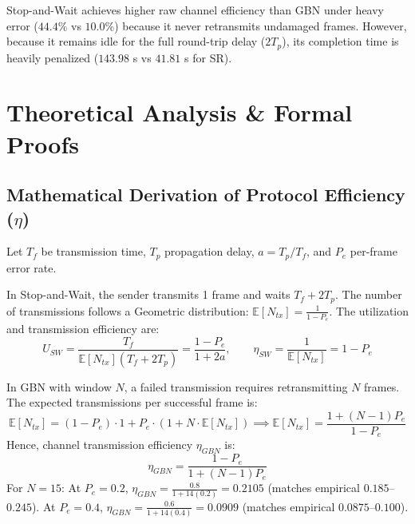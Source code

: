 \documentclass[11pt,a4paper]{article}
\begin{document}
\begin{analysisbox}
Stop-and-Wait achieves higher raw channel efficiency than GBN under heavy error ($44.4\%$ vs $10.0\%$) because it never retransmits undamaged frames. However, because it remains idle for the full round-trip delay ($2T_p$), its completion time is heavily penalized ($143.98$ s vs $41.81$ s for SR).
\end{analysisbox}

\section{Theoretical Analysis \& Formal Proofs}

\subsection{Mathematical Derivation of Protocol Efficiency (\texorpdfstring{$\eta$}{eta})}
Let $T_f$ be transmission time, $T_p$ propagation delay, $a = T_p / T_f$, and $P_e$ per-frame error rate.

\begin{proofbox}
In Stop-and-Wait, the sender transmits 1 frame and waits $T_f + 2T_p$. The number of transmissions follows a Geometric distribution: $\mathbb{E}[N_{tx}] = \frac{1}{1 - P_e}$. The utilization and transmission efficiency are:
\begin{equation}
    U_{SW} = \frac{T_f}{\mathbb{E}[N_{tx}](T_f + 2T_p)} = \frac{1 - P_e}{1 + 2a}, \qquad \eta_{SW} = \frac{1}{\mathbb{E}[N_{tx}]} = 1 - P_e
\end{equation}
\end{proofbox}

\begin{proofbox}
In GBN with window $N$, a failed transmission requires retransmitting $N$ frames. The expected transmissions per successful frame is:
\begin{equation}
    \mathbb{E}[N_{tx}] = (1 - P_e) \cdot 1 + P_e \cdot (1 + N \cdot \mathbb{E}[N_{tx}]) \implies \mathbb{E}[N_{tx}] = \frac{1 + (N-1)P_e}{1 - P_e}
\end{equation}
Hence, channel transmission efficiency $\eta_{GBN}$ is:
\begin{equation}
    \eta_{GBN} = \frac{1 - P_e}{1 + (N - 1)P_e}
\end{equation}
For $N = 15$: At $P_e=0.2$, $\eta_{GBN} = \frac{0.8}{1 + 14(0.2)} = 0.2105$ (matches empirical $0.185$--$0.245$). At $P_e=0.4$, $\eta_{GBN} = \frac{0.6}{1 + 14(0.4)} = 0.0909$ (matches empirical $0.0875$--$0.100$).
\end{proofbox}
\end{document}
